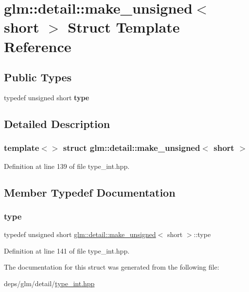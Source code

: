 \hypertarget{structglm_1_1detail_1_1make__unsigned_3_01short_01_4}{}\section{glm\+:\+:detail\+:\+:make\+\_\+unsigned$<$ short $>$ Struct Template Reference}
\label{structglm_1_1detail_1_1make__unsigned_3_01short_01_4}
\subsection*{Public Types}
\begin{DoxyCompactItemize}
\item 
\mbox{\label{structglm_1_1detail_1_1make__unsigned_3_01short_01_4_a58861091aca3a68acc085131cc6fefa4}} 
typedef unsigned short {\bfseries type}
\end{DoxyCompactItemize}


\subsection{Detailed Description}
\subsubsection*{template$<$$>$\newline
struct glm\+::detail\+::make\+\_\+unsigned$<$ short $>$}



Definition at line 139 of file type\+\_\+int.\+hpp.



\subsection{Member Typedef Documentation}
\mbox{\label{structglm_1_1detail_1_1make__unsigned_3_01short_01_4_a58861091aca3a68acc085131cc6fefa4}} 
\subsubsection{\texorpdfstring{type}{type}}
{\footnotesize\ttfamily typedef unsigned short \hyperlink{structglm_1_1detail_1_1make__unsigned}{glm\+::detail\+::make\+\_\+unsigned}$<$ short $>$\+::type}



Definition at line 141 of file type\+\_\+int.\+hpp.



The documentation for this struct was generated from the following file\+:\begin{DoxyCompactItemize}
\item 
deps/glm/detail/\hyperlink{type__int_8hpp}{type\+\_\+int.\+hpp}\end{DoxyCompactItemize}
